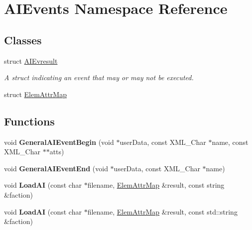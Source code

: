 \hypertarget{namespaceAIEvents}{}\section{A\+I\+Events Namespace Reference}
\label{namespaceAIEvents}
\subsection*{Classes}
\begin{DoxyCompactItemize}
\item 
struct \hyperlink{structAIEvents_1_1AIEvresult}{A\+I\+Evresult}
\begin{DoxyCompactList}\small\item\em A struct indicating an event that may or may not be executed. \end{DoxyCompactList}\item 
struct \hyperlink{structAIEvents_1_1ElemAttrMap}{Elem\+Attr\+Map}
\end{DoxyCompactItemize}
\subsection*{Functions}
\begin{DoxyCompactItemize}
\item 
void {\bfseries General\+A\+I\+Event\+Begin} (void $\ast$user\+Data, const X\+M\+L\+\_\+\+Char $\ast$name, const X\+M\+L\+\_\+\+Char $\ast$$\ast$atts)\hypertarget{namespaceAIEvents_adc5735397c3ba97b815e3659f9d83d99}{}\label{namespaceAIEvents_adc5735397c3ba97b815e3659f9d83d99}

\item 
void {\bfseries General\+A\+I\+Event\+End} (void $\ast$user\+Data, const X\+M\+L\+\_\+\+Char $\ast$name)\hypertarget{namespaceAIEvents_a319830e1c00ebfdb54b9719c226bdefd}{}\label{namespaceAIEvents_a319830e1c00ebfdb54b9719c226bdefd}

\item 
void {\bfseries Load\+AI} (const char $\ast$filename, \hyperlink{structAIEvents_1_1ElemAttrMap}{Elem\+Attr\+Map} \&result, const string \&faction)\hypertarget{namespaceAIEvents_a3979facd17d551e2c70c29389912754d}{}\label{namespaceAIEvents_a3979facd17d551e2c70c29389912754d}

\item 
void {\bfseries Load\+AI} (const char $\ast$filename, \hyperlink{structAIEvents_1_1ElemAttrMap}{Elem\+Attr\+Map} \&result, const std\+::string \&faction)\hypertarget{namespaceAIEvents_a0356629e34574db2d7273a53c521994c}{}\label{namespaceAIEvents_a0356629e34574db2d7273a53c521994c}

\end{DoxyCompactItemize}

